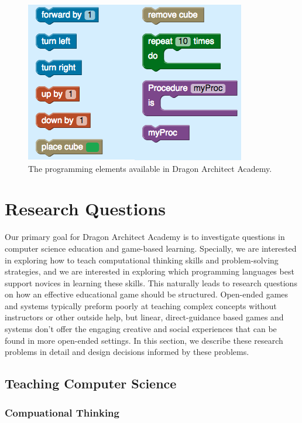 \documentclass{sig-alternate}
\newcommand{\gametitle}{{\color{RoyalPurple} Dragon Architect Academy}}
\begin{document}
\begin{figure}[htb]
  \centering
  \includegraphics[width=\columnwidth]{images/toolbox-wide}
  \caption{The programming elements available in \gametitle{}.}
  \label{fig:toolbox}
\end{figure}


\section{Research Questions}
\label{sec:research}

Our primary goal for \gametitle{} is to investigate questions in computer science education and game-based learning. 
Specially, we are interested in exploring how to teach computational thinking skills and problem-solving strategies, and we are interested in exploring which programming languages best support novices in learning these skills. 
This naturally leads to research questions on how an effective educational game should be structured.
Open-ended games and systems typically preform poorly at teaching complex concepts without instructors or other outside help, but linear, direct-guidance based games and systems don't offer the engaging creative and social experiences that can be found in more open-ended settings.
In this section, we describe these research problems in detail and design decisions informed by these problems.

\subsection{Teaching Computer Science}

\subsubsection{Compuational Thinking}
\end{document}
